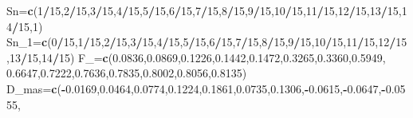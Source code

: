 \documentclass[
  a4paper,
  oneside,
  openany]{book}
\newenvironment{Shaded}{\begin{snugshade}}{\end{snugshade}}
\newcommand{\DecValTok}[1]{\textcolor[rgb]{0.00,0.00,0.81}{#1}}
\newcommand{\FloatTok}[1]{\textcolor[rgb]{0.00,0.00,0.81}{#1}}
\newcommand{\FunctionTok}[1]{\textcolor[rgb]{0.13,0.29,0.53}{\textbf{#1}}}
\newcommand{\NormalTok}[1]{#1}
\newcommand{\OtherTok}[1]{\textcolor[rgb]{0.56,0.35,0.01}{#1}}
\newcommand{\SpecialCharTok}[1]{\textcolor[rgb]{0.81,0.36,0.00}{\textbf{#1}}}
\begin{document}
\begin{Shaded}
\begin{Highlighting}[]
\NormalTok{Sn}\OtherTok{=}\FunctionTok{c}\NormalTok{(}\DecValTok{1}\SpecialCharTok{/}\DecValTok{15}\NormalTok{,}\DecValTok{2}\SpecialCharTok{/}\DecValTok{15}\NormalTok{,}\DecValTok{3}\SpecialCharTok{/}\DecValTok{15}\NormalTok{,}\DecValTok{4}\SpecialCharTok{/}\DecValTok{15}\NormalTok{,}\DecValTok{5}\SpecialCharTok{/}\DecValTok{15}\NormalTok{,}\DecValTok{6}\SpecialCharTok{/}\DecValTok{15}\NormalTok{,}\DecValTok{7}\SpecialCharTok{/}\DecValTok{15}\NormalTok{,}\DecValTok{8}\SpecialCharTok{/}\DecValTok{15}\NormalTok{,}\DecValTok{9}\SpecialCharTok{/}\DecValTok{15}\NormalTok{,}\DecValTok{10}\SpecialCharTok{/}\DecValTok{15}\NormalTok{,}\DecValTok{11}\SpecialCharTok{/}\DecValTok{15}\NormalTok{,}\DecValTok{12}\SpecialCharTok{/}\DecValTok{15}\NormalTok{,}\DecValTok{13}\SpecialCharTok{/}\DecValTok{15}\NormalTok{,}\DecValTok{14}\SpecialCharTok{/}\DecValTok{15}\NormalTok{,}\DecValTok{1}\NormalTok{)}
\NormalTok{Sn\_1}\OtherTok{=}\FunctionTok{c}\NormalTok{(}\DecValTok{0}\SpecialCharTok{/}\DecValTok{15}\NormalTok{,}\DecValTok{1}\SpecialCharTok{/}\DecValTok{15}\NormalTok{,}\DecValTok{2}\SpecialCharTok{/}\DecValTok{15}\NormalTok{,}\DecValTok{3}\SpecialCharTok{/}\DecValTok{15}\NormalTok{,}\DecValTok{4}\SpecialCharTok{/}\DecValTok{15}\NormalTok{,}\DecValTok{5}\SpecialCharTok{/}\DecValTok{15}\NormalTok{,}\DecValTok{6}\SpecialCharTok{/}\DecValTok{15}\NormalTok{,}\DecValTok{7}\SpecialCharTok{/}\DecValTok{15}\NormalTok{,}\DecValTok{8}\SpecialCharTok{/}\DecValTok{15}\NormalTok{,}\DecValTok{9}\SpecialCharTok{/}\DecValTok{15}\NormalTok{,}\DecValTok{10}\SpecialCharTok{/}\DecValTok{15}\NormalTok{,}\DecValTok{11}\SpecialCharTok{/}\DecValTok{15}\NormalTok{,}\DecValTok{12}\SpecialCharTok{/}\DecValTok{15}\NormalTok{,}\DecValTok{13}\SpecialCharTok{/}\DecValTok{15}\NormalTok{,}\DecValTok{14}\SpecialCharTok{/}\DecValTok{15}\NormalTok{)}
\NormalTok{F\_}\OtherTok{=}\FunctionTok{c}\NormalTok{(}\FloatTok{0.0836}\NormalTok{,}\FloatTok{0.0869}\NormalTok{,}\FloatTok{0.1226}\NormalTok{,}\FloatTok{0.1442}\NormalTok{,}\FloatTok{0.1472}\NormalTok{,}\FloatTok{0.3265}\NormalTok{,}\FloatTok{0.3360}\NormalTok{,}\FloatTok{0.5949}\NormalTok{,}
                    \FloatTok{0.6647}\NormalTok{,}\FloatTok{0.7222}\NormalTok{,}\FloatTok{0.7636}\NormalTok{,}\FloatTok{0.7835}\NormalTok{,}\FloatTok{0.8002}\NormalTok{,}\FloatTok{0.8056}\NormalTok{,}\FloatTok{0.8135}\NormalTok{)}
\NormalTok{D\_mas}\OtherTok{=}\FunctionTok{c}\NormalTok{(}\SpecialCharTok{{-}}\FloatTok{0.0169}\NormalTok{,}\FloatTok{0.0464}\NormalTok{,}\FloatTok{0.0774}\NormalTok{,}\FloatTok{0.1224}\NormalTok{,}\FloatTok{0.1861}\NormalTok{,}\FloatTok{0.0735}\NormalTok{,}\FloatTok{0.1306}\NormalTok{,}\SpecialCharTok{{-}}\FloatTok{0.0615}\NormalTok{,}\SpecialCharTok{{-}}\FloatTok{0.0647}\NormalTok{,}\SpecialCharTok{{-}}\FloatTok{0.0555}\NormalTok{,}

\end{Highlighting}
\end{Shaded}
\end{document}
